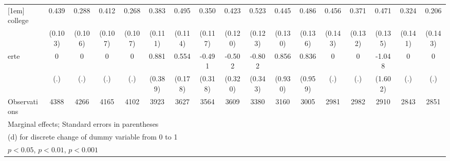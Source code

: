 {\begin{tabular}{l*{16}{c}}
[1em]
college             &       0.439\sym{***}&       0.288\sym{**} &       0.412\sym{***}&       0.268\sym{*}  &       0.383\sym{***}&       0.495\sym{***}&       0.350\sym{**} &       0.423\sym{***}&       0.523\sym{***}&       0.445\sym{***}&       0.486\sym{***}&       0.456\sym{**} &       0.371\sym{**} &       0.471\sym{***}&       0.324\sym{*}  &       0.206         \\
                    &     (0.103)         &     (0.106)         &     (0.107)         &     (0.107)         &     (0.111)         &     (0.114)         &     (0.117)         &     (0.120)         &     (0.123)         &     (0.130)         &     (0.136)         &     (0.143)         &     (0.132)         &     (0.135)         &     (0.141)         &     (0.143)         \\
[1em]
erte                &           0         &           0         &           0         &           0         &       0.881\sym{*}  &       0.554\sym{**} &      -0.491         &      -0.502         &      -0.802\sym{*}  &       0.856         &       0.836         &           0         &           0         &      -1.048         &           0         &           0         \\
                    &         (.)         &         (.)         &         (.)         &         (.)         &     (0.389)         &     (0.178)         &     (0.318)         &     (0.320)         &     (0.343)         &     (0.930)         &     (0.959)         &         (.)         &         (.)         &     (1.602)         &         (.)         &         (.)         \\
\hline
Observations        &        4388         &        4266         &        4165         &        4102         &        3923         &        3627         &        3564         &        3609         &        3380         &        3160         &        3005         &        2981         &        2982         &        2910         &        2843         &        2851         \\
\hline\hline
\multicolumn{17}{l}{\footnotesize Marginal effects; Standard errors in parentheses}\\
\multicolumn{17}{l}{\footnotesize  (d) for discrete change of dummy variable from 0 to 1}\\
\multicolumn{17}{l}{\footnotesize \sym{*} \(p<0.05\), \sym{**} \(p<0.01\), \sym{***} \(p<0.001\)}\\
\end{tabular}
}
